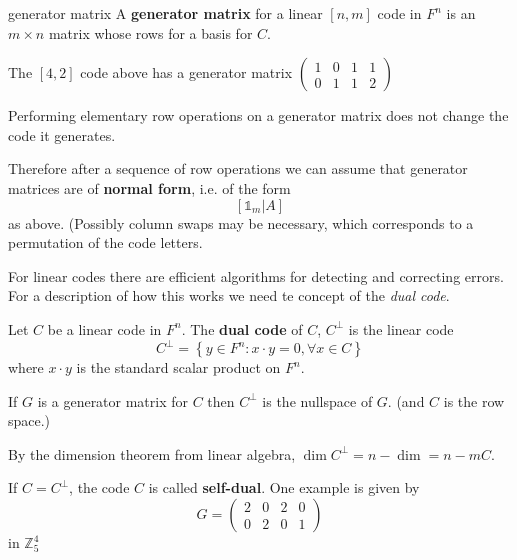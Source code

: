 \documentclass[english]{lbscript}
\begin{document}
\begin{definition}{generator matrix}{}
  A \textbf{generator matrix} for a linear \([n,m]\) code in \(F^{n}\) is an \(m×n\) matrix whose rows for a basis for \(C\).
\end{definition}

\begin{example}{}{}
  The \([4,2]\) code above has a generator matrix \(\begin{pmatrix}
    1 & 0 & 1 & 1 \\
    0 & 1 & 1 & 2
  \end{pmatrix}\)
\end{example}
\begin{remark}{}{}
  Performing elementary row operations on a generator matrix does not change the code it generates.
\end{remark}
Therefore after a sequence of row operations we can assume that generator matrices are of \textbf{normal form}, i.e. of the form
\begin{equation}
  \label{eq:139}
  \left[𝟙_{m} | A\right]
\end{equation}
as above. (Possibly column swaps may be necessary, which corresponds to a permutation of the code letters.

For linear codes there are efficient algorithms for detecting and correcting errors. For a description of how this works we need te concept of the \emph{dual code}.

\begin{definition}{}{}
  Let \(C\) be a linear code in \(F^{n}\). The \textbf{dual code} of \(C\), \(C^{⟂}\) is the linear code
  \begin{equation}
    \label{eq:140}
    C^{⟂}=\left\{ y∈F^{n}: x⋅y=0, ∀x∈C \right\}
  \end{equation}
  where \(x⋅y\) is the standard scalar product on \(F^{n}\).
\end{definition}

\begin{remark}{}{}
  If \(G\) is a generator matrix for \(C\) then \(C^{⟂}\) is the nullspace of \(G\). (and \(C\) is the row space.)

  By the dimension theorem from linear algebra, \(\dim C^{⟂}=n-\dim =n-mC\).

  If \(C=C^{⟂}\), the code \(C\) is called \textbf{self-dual}. One example is given by
  \begin{equation}
    \label{eq:141}
    G=\begin{pmatrix}
      2 & 0 & 2 & 0 \\
      0 & 2 & 0 & 1
    \end{pmatrix}
  \end{equation} in \(ℤ_{5}^{4}\)
\end{remark}
\end{document}
